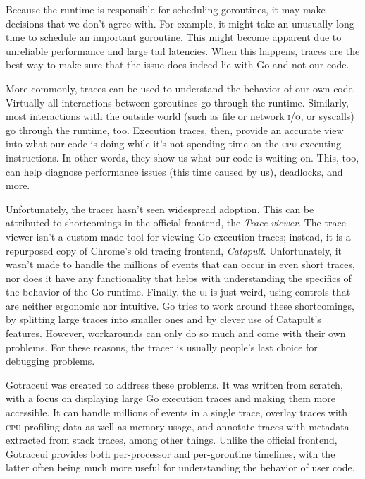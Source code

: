 \documentclass[10pt,letterpaper,oneside,openany,english]{memoir}
\begin{document}
Because the runtime is responsible for scheduling goroutines, it may make decisions that we don't agree with.
For example, it might take an unusually long time to schedule an important goroutine.
This might become apparent due to unreliable performance and large tail latencies.
When this happens, traces are the best way to make sure that the issue does indeed lie with Go and not our code.

More commonly, traces can be used to understand the behavior of our own code.
Virtually all interactions between goroutines go through the runtime.
Similarly, most interactions with the outside world (such as file or network \textsc{i/o}, or syscalls) go through the runtime, too.
Execution traces, then, provide an accurate view into what our code is doing while it's not spending time on the \textsc{cpu} executing instructions.
In other words, they show us what our code is waiting on.
This, too, can help diagnose performance issues (this time caused by us), deadlocks, and more.

Unfortunately, the tracer hasn't seen widespread adoption.
This can be attributed to shortcomings in the official frontend, the \emph{Trace viewer}.
The trace viewer isn't a custom-made tool for viewing Go execution traces;
instead, it is a repurposed copy of Chrome's old tracing frontend, \emph{Catapult}.
Unfortunately, it wasn't made to handle the millions of events that can occur in even short traces,
nor does it have any functionality that helps with understanding the specifics of the behavior of the Go runtime.
Finally, the \textsc{ui} is just weird, using controls that are neither ergonomic nor intuitive.
Go tries to work around these shortcomings, by splitting large traces into smaller ones and by clever use of Catapult's features.
However, workarounds can only do so much and come with their own problems.
For these reasons, the tracer is usually people's last choice for debugging problems.

Gotraceui was created to address these problems.
It was written from scratch, with a focus on displaying large Go execution traces and making them more accessible.
It can handle millions of events in a single trace, overlay traces with \textsc{cpu} profiling data as well as memory usage,
and annotate traces with metadata extracted from stack traces, among other things.
Unlike the official frontend, Gotraceui provides both per-processor and per-goroutine timelines,
with the latter often being much more useful for understanding the behavior of user code.
\end{document}
